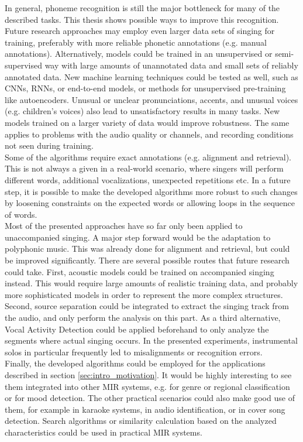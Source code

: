 In general, phoneme recognition is still the major bottleneck for many of the described tasks. This thesis shows possible ways to improve this recognition. Future research approaches may employ even larger data sets of singing for training, preferably with more reliable phonetic annotations (e.g. manual annotations). Alternatively, models could be trained in an unsupervised or semi-supervised way with large amounts of unannotated data and small sets of reliably annotated data. New machine learning techniques could be tested as well, such as CNNs, RNNs, or end-to-end models, or methods for unsupervised pre-training like autoencoders.
Unusual or unclear pronunciations, accents, and unusual voices (e.g. children's voices) also lead to unsatisfactory results in many tasks. New models trained on a larger variety of data would improve robustness. The same applies to problems with the audio quality or channels, and recording conditions not seen during training.\\

Some of the algorithms require exact annotations (e.g. alignment and retrieval). This is not always a given in a real-world scenario, where singers will perform different words, additional vocalizations, unexpected repetitions etc. In a future step, it is possible to make the developed algorithms more robust to such changes by loosening constraints on the expected words or allowing loops in the sequence of words.\\

Most of the presented approaches have so far only been applied to unaccompanied singing. A major step forward would be the adaptation to polyphonic music. This was already done for alignment and retrieval, but could be improved significantly. There are several possible routes that future research could take. First, acoustic models could be trained on accompanied singing instead. This would require large amounts of realistic training data, and probably more sophisticated models in order to represent the more complex structures. Second, source separation could be integrated to extract the singing track from the audio, and only perform the analysis on this part. As a third alternative, Vocal Activity Detection could be applied beforehand to only analyze the segments where actual singing occurs. In the presented experiments, instrumental solos in particular frequently led to misalignments or recognition errors.\\

Finally, the developed algorithms could be employed for the applications described in section \ref{sec:intro_motivation}. It would be highly interesting to see them integrated into other MIR systems, e.g. for genre or regional classification or for mood detection. The other practical scenarios could also make good use of them, for example in karaoke systems, in audio identification, or in cover song detection. Search algorithms or similarity calculation based on the analyzed characteristics could be used in practical MIR systems.
